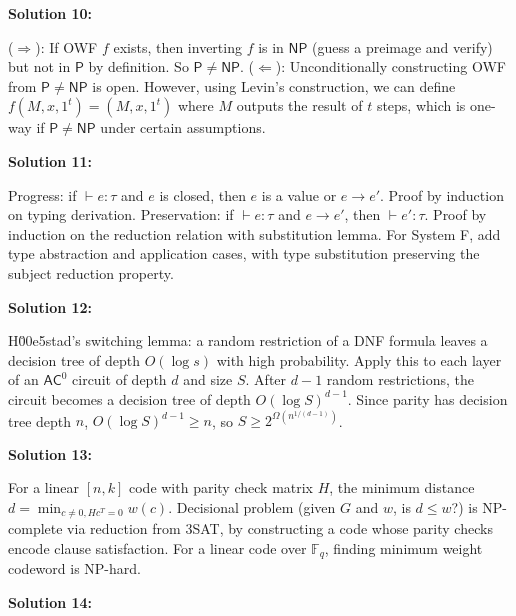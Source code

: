 \documentclass[12pt,a4paper]{exam}
\begin{document}
\vspace{0.5cm}

\textbf{Solution 10:}

($\Rightarrow$): If OWF $f$ exists, then inverting $f$ is in $\mathsf{NP}$ (guess a preimage and verify) but not in $\mathsf{P}$ by definition. So $\mathsf{P} \neq \mathsf{NP}$. ($\Leftarrow$): Unconditionally constructing OWF from $\mathsf{P} \neq \mathsf{NP}$ is open. However, using Levin's construction, we can define $f(M,x,1^t) = (M,x,1^t)$ where $M$ outputs the result of $t$ steps, which is one-way if $\mathsf{P} \neq \mathsf{NP}$ under certain assumptions.

\vspace{0.5cm}

\textbf{Solution 11:}

Progress: if $\vdash e: \tau$ and $e$ is closed, then $e$ is a value or $e \to e'$. Proof by induction on typing derivation. Preservation: if $\vdash e: \tau$ and $e \to e'$, then $\vdash e': \tau$. Proof by induction on the reduction relation with substitution lemma. For System F, add type abstraction and application cases, with type substitution preserving the subject reduction property.

\vspace{0.5cm}

\textbf{Solution 12:}

H\u00e5stad's switching lemma: a random restriction of a DNF formula leaves a decision tree of depth $O(\log s)$ with high probability. Apply this to each layer of an $\mathsf{AC}^0$ circuit of depth $d$ and size $S$. After $d-1$ random restrictions, the circuit becomes a decision tree of depth $O(\log S)^{d-1}$. Since parity has decision tree depth $n$, $O(\log S)^{d-1} \geq n$, so $S \geq 2^{\Omega(n^{1/(d-1)})}$.

\vspace{0.5cm}

\textbf{Solution 13:}

For a linear $[n,k]$ code with parity check matrix $H$, the minimum distance $d = \min_{c \neq 0, Hc^T=0} w(c)$. Decisional problem (given $G$ and $w$, is $d \leq w$?) is NP-complete via reduction from 3SAT, by constructing a code whose parity checks encode clause satisfaction. For a linear code over $\mathbb{F}_q$, finding minimum weight codeword is NP-hard.

\vspace{0.5cm}

\textbf{Solution 14:}
\end{document}
